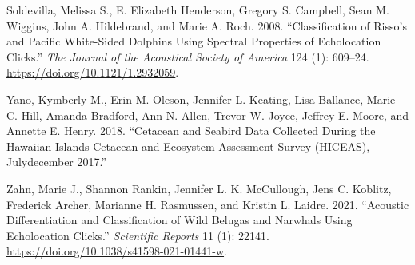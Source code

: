 \documentclass[
  letterpaper,
  DIV=11,
  numbers=noendperiod]{scrartcl}
\newlength{\cslhangindent}
\newlength{\cslentryspacingunit} %
\newenvironment{CSLReferences}[2] %
 {%
  \setlength{\parindent}{0pt}
  \ifodd #1
  \let\oldpar\par
  \def\par{\hangindent=\cslhangindent\oldpar}
  \fi
  \setlength{\parskip}{#2\cslentryspacingunit}
 }%
 {}
\begin{document}
\begin{CSLReferences}{1}{0}
\leavevmode{}%
Soldevilla, Melissa S., E. Elizabeth Henderson, Gregory S. Campbell,
Sean M. Wiggins, John A. Hildebrand, and Marie A. Roch. 2008.
{``Classification of Risso{'}s and Pacific White-Sided Dolphins Using
Spectral Properties of Echolocation Clicks.''} \emph{The Journal of the
Acoustical Society of America} 124 (1): 609--24.
\url{https://doi.org/10.1121/1.2932059}.

\leavevmode{}%
Yano, Kymberly M., Erin M. Oleson, Jennifer L. Keating, Lisa Ballance,
Marie C. Hill, Amanda Bradford, Ann N. Allen, Trevor W. Joyce, Jeffrey
E. Moore, and Annette E. Henry. 2018. {``Cetacean and Seabird Data
Collected During the Hawaiian Islands Cetacean and Ecosystem Assessment
Survey (HICEAS), July{\textendash}december 2017.''}

\leavevmode{}%
Zahn, Marie J., Shannon Rankin, Jennifer L. K. McCullough, Jens C.
Koblitz, Frederick Archer, Marianne H. Rasmussen, and Kristin L. Laidre.
2021. {``Acoustic Differentiation and Classification of Wild Belugas and
Narwhals Using Echolocation Clicks.''} \emph{Scientific Reports} 11 (1):
22141. \url{https://doi.org/10.1038/s41598-021-01441-w}.

\end{CSLReferences}
\end{document}
